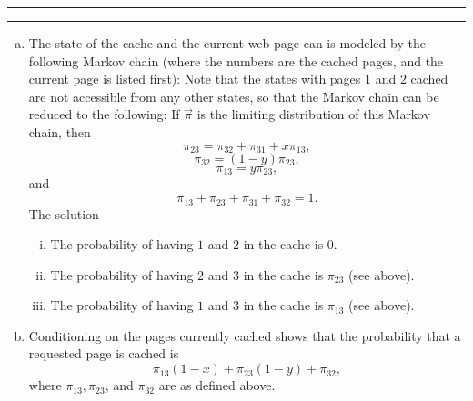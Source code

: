 \documentclass[11pt]{article}
\newcounter{questionCounter}
\newcounter{partCounter}[questionCounter]
\newenvironment{question}[2][\arabic{questionCounter}]{%
    \setcounter{partCounter}{0}%
    \vspace{.25in} \hrule \vspace{0.5em}%
        \noindent{\bf #2}%
    \vspace{0.8em} \hrule \vspace{.10in}%
    \addtocounter{questionCounter}{1}%
}{}
\begin{document}
\newpage
\begin{question}{Problem 10.1 Caching}
\begin{enumerate}[(a)]
\item The state of the cache and the current web page can is modeled by the
following Markov chain (where the numbers are the cached pages, and the
current page is listed first):
\vspace{3cm}
Note that the states with pages $1$ and $2$ cached are not accessible from any
other states, so that the Markov chain can be reduced to the following:
\vspace{3cm}
If $\vec{\pi}$ is the limiting distribution of this Markov chain, then
\[\pi_{23} = \pi_{32} + \pi_{31} + x\pi_{13},\]
\[\pi_{32} = (1 - y) \pi_{23},\] \[\pi_{13} = y\pi_{23},\] and
\[\pi_{13} + \pi_{23} + \pi_{31} + \pi_{32} = 1.\]
The solution
\begin{enumerate}[(i)]
\item The probability of having $1$ and $2$ in the cache is $0$.

\item The probability of having $2$ and $3$ in the cache is
 $\pi_{23}$ (see above).

\item The probability of having $1$ and $3$ in the cache is
$\pi_{13}$ (see above).

\end{enumerate}

\item Conditioning on the pages currently cached shows that the probability
that a requested page is cached is
\[\pi_{13}(1 - x) + \pi_{23}(1 - y) + \pi_{32},\]
where $\pi_{13},\pi_{23}$, and $\pi_{32}$ are as defined above.

\end{enumerate}
\end{question}
\end{document}
